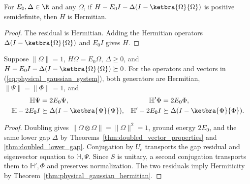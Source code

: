 \begin{theorem}
    \label{thm:physical_gaussian_hermitian}
    \leanok
    For $E_0,\Delta\in\R$ and any $\Omega$, if
    $H-E_0I-\Delta(I-\ketbra{\Omega}{\Omega})$ is positive semidefinite,
    then $H$ is Hermitian.
\end{theorem}
\begin{proof}\leanok
    The residual is Hermitian. Adding the Hermitian operators
    $\Delta(I-\ketbra{\Omega}{\Omega})$ and $E_0I$ gives $H$.
\end{proof}

\begin{theorem}
    \label{thm:physical_gaussian_ground_pair}
    \leanok
    Suppose $\|\Omega\|=1$, $H\Omega=E_0\Omega$, $\Delta\ge0$, and
    $H-E_0I-\Delta(I-\ketbra{\Omega}{\Omega})\succeq0$.
    For the operators and vectors in
    (\ref{eq:physical_gaussian_system}), both generators are Hermitian,
    $\|\Psi\|=\|\Phi\|=1$, and
    \begin{align}
        \mathbb H\Psi&=2E_0\Psi,
            & \mathbb H'\Phi&=2E_0\Phi,
            \label{eq:physical_gaussian_gaps}\\
        \mathbb H-2E_0I&\succeq
            \Delta(I-\ketbra{\Psi}{\Psi}),
            & \mathbb H'-2E_0I&\succeq
            \Delta(I-\ketbra{\Phi}{\Phi}).
            \notag
    \end{align}
\end{theorem}
\begin{proof}\leanok
    Doubling gives $\|\Omega\otimes\Omega\|=\|\Omega\|^2=1$,
    ground energy $2E_0$, and the same lower gap $\Delta$ by
    Theorems~\ref{thm:doubled_vector_properties} and
    \ref{thm:doubled_lower_gap}.
    Conjugation by $U_e$ transports the gap residual and eigenvector
    equation to $\mathbb H,\Psi$.
    Since $S$ is unitary, a second conjugation transports them to
    $\mathbb H',\Phi$ and preserves normalization.
    The two residuals imply Hermiticity by
    Theorem~\ref{thm:physical_gaussian_hermitian}.
\end{proof}

